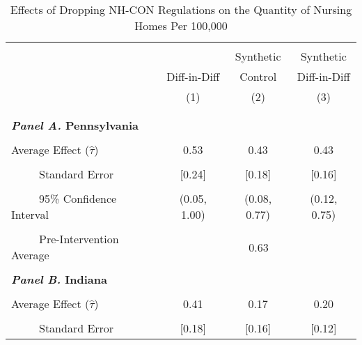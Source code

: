 \documentclass[../Main.tex]{subfiles}
\begin{document}



\newpage
\null
\vfill
\begin{table}[htbp]\centering \footnotesize
\def\sym#1{\ifmmode^{#1}\else\(^{#1}\)\fi}
\captionsetup{width=.69\textwidth}
\caption{\centering Effects of Dropping NH-CON Regulations on the Quantity of Nursing Homes Per 100,000}
\label{tab:ave_results_q_nh}
\setlength{\tabcolsep}{10pt}
\begin{tabular}{l*{3}{c}}
\hline\hline
\\[-2ex]
&\multicolumn{1}{c}{}&\multicolumn{1}{c}{Synthetic}&\multicolumn{1}{c}{Synthetic}\\
&\multicolumn{1}{c}{Diff-in-Diff}&\multicolumn{1}{c}{Control}&\multicolumn{1}{c}{Diff-in-Diff}\\
&\multicolumn{1}{c}{(1)}&\multicolumn{1}{c}{(2)}&\multicolumn{1}{c}{(3)}\\
\\[-2ex]
\hline
\\[-.1ex]
\multicolumn{4}{l}{\textbf{\textit{Panel A.} Pennsylvania}}\\
\\[-1.5ex]
\multicolumn{1}{l}{Average Effect ($\hat{\tau}$)}&   \multicolumn{1}{c}{0.53}&   \multicolumn{1}{c}{0.43}&  \multicolumn{1}{c}{0.43}\\
\\[-2ex]
\multicolumn{1}{l}{\ \ \ \ \ Standard Error}  &\multicolumn{1}{c}{[0.24]}&\multicolumn{1}{c}{[0.18]}&\multicolumn{1}{c}{[0.16]}\\
\\[-2ex]
\multicolumn{1}{l}{\ \ \ \ \ 95\% Confidence Interval}&   \multicolumn{1}{c}{(0.05, 1.00)}&   \multicolumn{1}{c}{(0.08, 0.77)}&   \multicolumn{1}{c}{(0.12, 0.75)}\\
\\[-2ex]
\multicolumn{1}{l}{\ \ \ \ \ Pre-Intervention Average}&   \multicolumn{3}{c}{0.63}\\
\\[-.1ex]
\multicolumn{4}{l}{\textbf{\textit{Panel B.} Indiana}}\\
\\[-1.5ex]
\multicolumn{1}{l}{Average Effect ($\hat{\tau}$)}&   \multicolumn{1}{c}{0.41}&   \multicolumn{1}{c}{0.17}&  \multicolumn{1}{c}{0.20}\\
\\[-2ex]
\multicolumn{1}{l}{\ \ \ \ \ Standard Error}  &\multicolumn{1}{c}{[0.18]}&\multicolumn{1}{c}{[0.16]}&\multicolumn{1}{c}{[0.12]}\\

\end{tabular}
\end{table}
\end{document}
